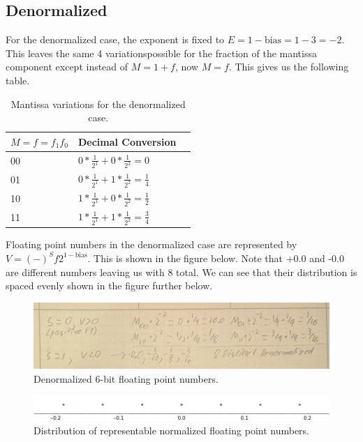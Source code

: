 \documentclass[12pt,letter]{article}
\begin{document}
\subsection{Denormalized}
For the denormalized case, the exponent is fixed to $E=1-\text{bias}=1-3=-2$. This leaves the same 4 variationspossible for the 
fraction of the mantissa component except instead of $M=1+f$, now $M=f$. This gives us the following table.
\begin{table}[h!]
    \centering
\begin{tabular}{l|l|l}
    $M=f=f_1f_0$ & Decimal Conversion                                             \\ \hline
    00         & $0*\frac{1}{2^1} + 0*\frac{1}{2^2} = 0$                                                 \\
    01         & $0*\frac{1}{2^1} + 1*\frac{1}{2^2} = \frac{1}{4}$                  \\
    10         & $1*\frac{1}{2^1} + 0*\frac{1}{2^2} = \frac{1}{2}$         \\
    11         & $1*\frac{1}{2^1} + 1*\frac{1}{2^2} = \frac{3}{4}$        \\
\end{tabular}
\caption{Mantissa variations for the denormalized case.}
\label{tab:mant-denorm}
\end{table}

Floating point numbers in the denormalized case are represented by $V=(-)^S f 2^{1-\text{bias}}$. 
This is shown in the figure below. Note that +0.0 and -0.0 are different numbers leaving us with 8 total.
We can see that their distribution is spaced evenly shown in the figure further below.
\begin{figure}[h]
    \centering
    \includegraphics[scale=0.15]{denorm.jpg}
    \caption{Denormalized 6-bit floating point numbers.}
\end{figure}

\begin{figure}[h!]
    \centering
    \includegraphics[scale=0.75]{numberline_denorm.png}
    \caption{Distribution of representable normalized floating point numbers.}
\end{figure}
\end{document}
